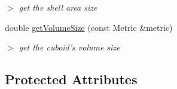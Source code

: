 \begin{DoxyCompactItemize}
\begin{DoxyCompactList}\small\item\em $>$ get the shell area size \end{DoxyCompactList}\item 
\hypertarget{classCuboid_a814655a4dad4ddc9e2e743a19786088e}{double \hyperlink{classCuboid_a814655a4dad4ddc9e2e743a19786088e}{get\-Volume\-Size} (const \-Metric \&metric)}\label{classCuboid_a814655a4dad4ddc9e2e743a19786088e}

\begin{DoxyCompactList}\small\item\em $>$ get the cuboid's volume size \end{DoxyCompactList}\end{DoxyCompactItemize}
\subsection*{\-Protected \-Attributes}
